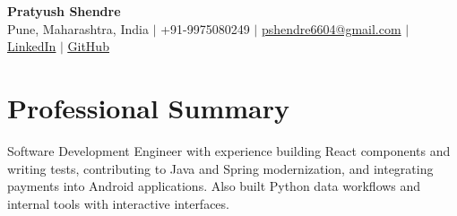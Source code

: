 \documentclass[a4paper,11pt]{article}
\begin{document}
\begin{center}
  {\Large\bfseries Pratyush Shendre}\\[2pt]
  \small Pune, Maharashtra, India $|$ +91-9975080249 $|$
  \href{mailto:pshendre6604@gmail.com}{pshendre6604@gmail.com} $|$
  \href{https://www.linkedin.com/in/pratyush-shendre-2256a7223/}{\underline{LinkedIn}} $|$
  \href{https://github.com/PratyushS04}{\underline{GitHub}}
\end{center}

\section{Professional Summary}
\small Software Development Engineer with experience building React components and writing tests, contributing to Java and Spring modernization, and integrating payments into Android applications. Also built Python data workf{}lows and internal tools with interactive interfaces.
\end{document}
